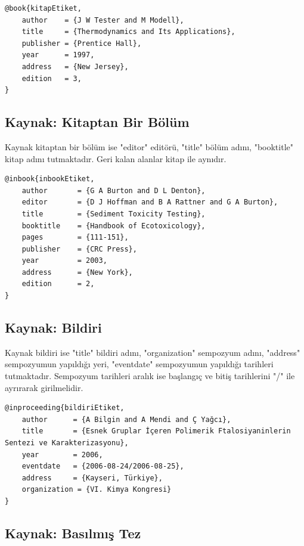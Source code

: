 \begin{lstlisting}[language={[LaTeX]{TeX}}, label=bib:book, caption=Kaynak bir kitap ise]
@book{kitapEtiket,
	author    = {J W Tester and M Modell}, 
	title     = {Thermodynamics and Its Applications},
	publisher = {Prentice Hall},
	year      = 1997,
	address   = {New Jersey},
	edition   = 3,
}
\end{lstlisting}

\subsection{Kaynak: Kitaptan Bir Bölüm}

Kaynak kitaptan bir bölüm ise "editor" editörü, "title" bölüm adını, "booktitle" kitap adını tutmaktadır. Geri kalan alanlar kitap ile aynıdır. 

\begin{lstlisting}[language={[LaTeX]{TeX}}, label=bib:inbook, caption=Kaynak kitaptan bölüm ise]
@inbook{inbookEtiket,
	author       = {G A Burton and D L Denton}, 
	editor       = {D J Hoffman and B A Rattner and G A Burton},
	title 	     = {Sediment Toxicity Testing},
	booktitle    = {Handbook of Ecotoxicology},
	pages        = {111-151},
	publisher    = {CRC Press},
	year         = 2003,
	address      = {New York},
	edition      = 2,
}
\end{lstlisting}


\subsection{Kaynak: Bildiri}

Kaynak bildiri ise "title" bildiri adını, "organization" sempozyum adını, "address" sempozyumun yapıldığı yeri, "eventdate" sempozyumun yapıldığı tarihleri tutmaktadır. Sempozyum tarihleri aralık ise başlangıç ve bitiş tarihlerini "/" ile ayrırarak girilmelidir.

\begin{lstlisting}[language={[LaTeX]{TeX}}, label=bib:inproceeding, caption=Kaynak bildiri ise]
@inproceeding{bildiriEtiket,
	author 		= {A Bilgin and A Mendi and Ç Yağcı},
	title       = {Esnek Gruplar İçeren Polimerik Ftalosiyaninlerin Sentezi ve Karakterizasyonu},
	year		= 2006,
	eventdate   = {2006-08-24/2006-08-25},
	address     = {Kayseri, Türkiye},
	organization = {VI. Kimya Kongresi}
}
\end{lstlisting}


\subsection{Kaynak: Basılmış Tez}

